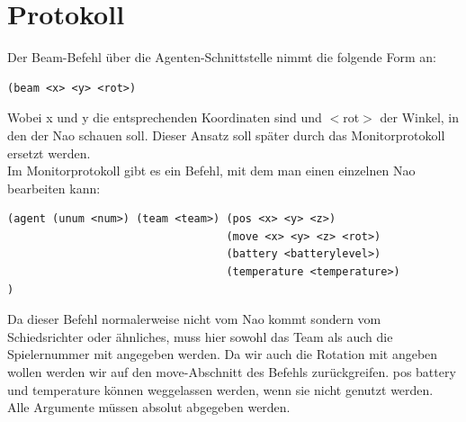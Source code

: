 \section{Protokoll}
Der Beam-Befehl über die Agenten-Schnittstelle nimmt die folgende Form an:

\begin{verbatim}(beam <x> <y> <rot>)
\end{verbatim}
Wobei x und y die entsprechenden Koordinaten sind und $<$rot$>$ der
 Winkel, in den der Nao schauen soll. Dieser Ansatz soll später durch das Monitorprotokoll ersetzt 
werden.\\
Im Monitorprotokoll gibt es ein Befehl, mit dem man einen einzelnen Nao bearbeiten kann:

\begin{verbatim}(agent (unum <num>) (team <team>) (pos <x> <y> <z>)
                                  (move <x> <y> <z> <rot>)
                                  (battery <batterylevel>)
                                  (temperature <temperature>)
)
\end{verbatim}
Da dieser Befehl normalerweise nicht vom Nao kommt sondern vom 
Schiedsrichter oder ähnliches, muss hier sowohl das Team als auch die 
Spielernummer mit angegeben werden. Da wir auch die Rotation mit angeben
 wollen werden wir auf den move-Abschnitt des Befehls zurückgreifen. pos
 battery und temperature können weggelassen werden, wenn sie nicht 
genutzt werden.\\
Alle Argumente müssen absolut abgegeben werden.
